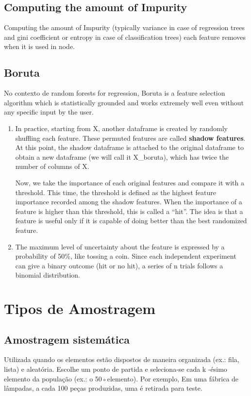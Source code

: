 \subsection{Computing the amount of Impurity}
Computing the amount of Impurity (typically variance in case of regression trees and gini coefficient or entropy in case of classification trees) each feature removes when it is used in node.

\subsection{Boruta}
No contexto de random forests for regression, Boruta is a feature selection algorithm which is statistically grounded and works extremely well even without any specific input by the user.
    
\begin{enumerate}
\item In practice, starting from X, another dataframe is created by randomly shuffling each feature. These permuted features are called \textbf{shadow features}. At this point, the shadow dataframe is attached to the original dataframe to obtain a new dataframe (we will call it X\_boruta), which has twice the number of columns of X.

Now, we take the importance of each original features and compare it with a threshold. This time, the threshold is defined as the highest feature importance recorded among the shadow features. When the importance of a feature is higher than this threshold, this is called a “hit”. The idea is that a feature is useful only if it is capable of doing better than the best randomized feature.

\item The maximum level of uncertainty about the feature is expressed by a probability of 50\%, like tossing a coin. Since each independent experiment can give a binary outcome (hit or no hit), a series of n trials follows a binomial distribution.
\end{enumerate}

\section{Tipos de Amostragem}

\subsection{Amostragem sistemática}
Utilizada quando os elementos estão dispostos de maneira organizada (ex.: fila, lista) e aleatória. Escolhe um ponto de partida e seleciona-se cada k -ésimo elemento da população (ex.: o 50◦elemento). Por exemplo, Em uma fábrica de lâmpadas, a cada 100 peças produzidas, uma é retirada para teste.

